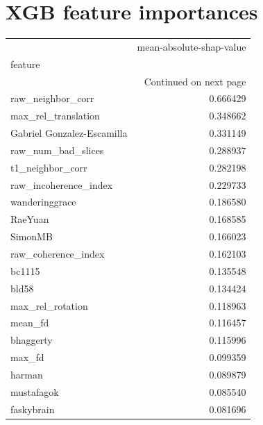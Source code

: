\documentclass[9pt,lineno]{elife}
\begin{document}
\appendix
\begin{appendixbox}
\label{feature-importance:app}
\section{XGB feature importances}

\begin{longtable}{lr}
\toprule
{} &  mean-absolute-shap-value \\
feature                    &                           \\
\midrule
\endhead
\midrule
\multicolumn{2}{r}{{Continued on next page}} \\
\midrule
\endfoot

\bottomrule
\endlastfoot
raw\_neighbor\_corr          &                  0.666429 \\
max\_rel\_translation        &                  0.348662 \\
Gabriel Gonzalez-Escamilla &                  0.331149 \\
raw\_num\_bad\_slices         &                  0.288937 \\
t1\_neighbor\_corr           &                  0.282198 \\
raw\_incoherence\_index      &                  0.229733 \\
wanderinggrace             &                  0.186580 \\
RaeYuan                    &                  0.168585 \\
SimonMB                    &                  0.166023 \\
raw\_coherence\_index        &                  0.162103 \\
bc1115                     &                  0.135548 \\
bld58                      &                  0.134424 \\
max\_rel\_rotation           &                  0.118963 \\
mean\_fd                    &                  0.116457 \\
bhaggerty                  &                  0.115996 \\
max\_fd                     &                  0.099359 \\
harman                     &                  0.089879 \\
mustafagok                 &                  0.085540 \\
faskybrain                 &                  0.081696 \\

\end{longtable}
\end{appendixbox}
\end{document}
